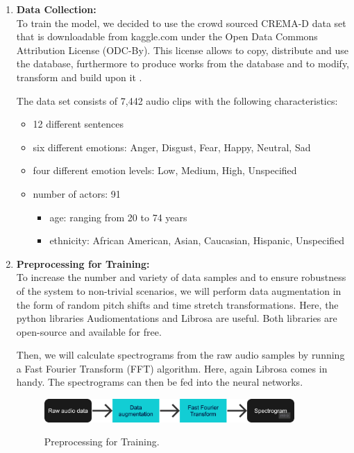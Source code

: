 \begin{enumerate}
\item \textbf{Data Collection:} \\
To train the model, we decided to use the crowd sourced CREMA-D data \cite{cremad} set that is downloadable from kaggle.com under the Open Data Commons Attribution License (ODC-By). This license allows to copy, distribute and use the database, furthermore to produce works from the database and to modify, transform and build upon it \cite{odc-by}.

The data set consists of 7,442 audio clips with the following characteristics: 
\begin{itemize}
    \item 12 different sentences
    \item six different emotions: Anger, Disgust, Fear, Happy, Neutral, Sad
    \item four different emotion levels: Low, Medium, High, Unspecified
    \item number of actors: 91
    \begin{itemize}
        \item age: ranging from 20 to 74 years
        \item ethnicity: African American, Asian, Caucasian, Hispanic, Unspecified
    \end{itemize}
\end{itemize}



\item \textbf{Preprocessing for Training:} \\
To increase the number and variety of data samples and to ensure robustness of the system to non-trivial scenarios, we will perform data augmentation in the form of random pitch shifts and time stretch transformations. Here, the python libraries Audiomentations and Librosa are useful. Both libraries are open-source and available for free. 

Then, we will calculate spectrograms from the raw audio samples by running a Fast Fourier Transform (FFT) algorithm. Here, again Librosa comes in handy. The spectrograms can then be fed into the neural networks.  

\begin{figure}[h]
\centering
\includegraphics[width=0.9\textwidth]{images/ser-preprocessing.png}\\
\caption{Preprocessing for Training.}\label{fig:ser_preprocessing}
\end{figure}


\end{enumerate}
